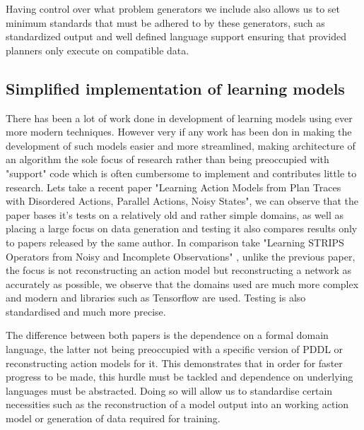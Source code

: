 Having control over what problem generators we include also allows us to set minimum standards that must be adhered to by these generators, such as standardized output and well defined language support ensuring that provided planners only execute on compatible data.



\subsection{Simplified implementation of learning models}
There has been a lot of work done in development of learning models using ever more modern techniques. However very if any work has been don in making the development of such models easier and more streamlined, making architecture of an algorithm the sole focus of research rather than being preoccupied with "support" code which is often cumbersome to implement and contributes little to research. Lets take a recent paper "Learning Action Models from Plan Traces with Disordered Actions, Parallel Actions, Noisy States"\cite{AAAIPres94:online}, we can observe that the paper bases it's tests on a relatively old and rather simple domains, as well as placing a large focus on data generation and testing it also compares results only to papers released by the same author. In comparison take "Learning STRIPS Operators from Noisy and Incomplete Observations" \cite{1210488932:online}, unlike the previous paper, the focus is not reconstructing an action model but reconstructing a network as accurately as possible, we observe that the domains used are much more complex and modern and libraries such as Tensorflow are used. Testing is also standardised and much more precise. 

The difference between both papers is the dependence on a formal domain language, the latter not being preoccupied with a specific version of PDDL or reconstructing action models for it. This demonstrates that in order for faster progress to be made, this hurdle must be tackled and dependence on underlying languages must be abstracted. Doing so will allow us to standardise certain necessities such as the reconstruction of a model output into an working action model or generation of data required for training.



